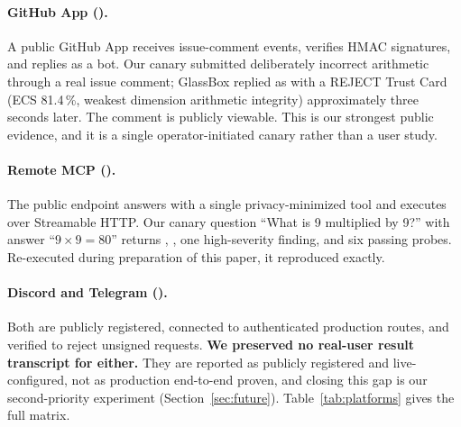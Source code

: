 \paragraph{GitHub App ().}
A public GitHub App receives issue-comment events, verifies HMAC signatures, and replies
as a bot. Our canary submitted deliberately incorrect arithmetic through a real issue
comment; GlassBox replied as  with a REJECT Trust Card
(ECS 81.4\,\%, weakest dimension arithmetic integrity) approximately three seconds later.
The comment is publicly viewable. This is our strongest public evidence, and it is a
single operator-initiated canary rather than a user study.

\paragraph{Remote MCP ().}
The public endpoint answers  with a single privacy-minimized tool and
executes  over Streamable HTTP. Our canary question ``What is 9 multiplied
by 9?'' with answer ``$9 \times 9 = 80$'' returns ,
, one high-severity  finding, and six passing
probes. Re-executed during preparation of this paper, it reproduced exactly.

\paragraph{Discord and Telegram ().}
Both are publicly registered, connected to authenticated production routes, and verified to
reject unsigned requests. \textbf{We preserved no real-user result transcript for either.}
They are reported as publicly registered and live-configured, not as production end-to-end
proven, and closing this gap is our second-priority experiment
(Section~\ref{sec:future}). Table~\ref{tab:platforms} gives the full matrix.


